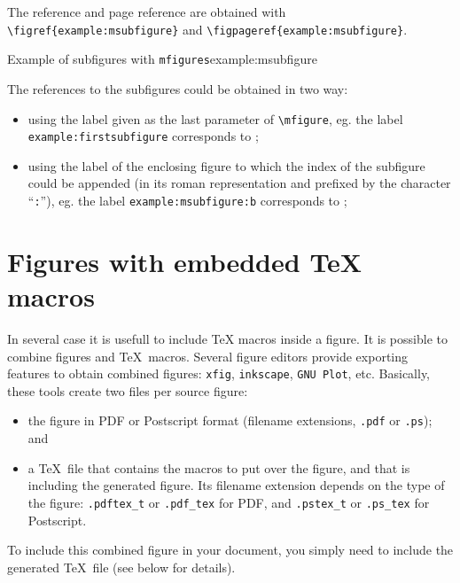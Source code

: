 \documentclass[book]{upmethodology-document}
\begin{document}
The reference and page reference are obtained with \texttt{{\textbackslash}figref\{example:msubfigure\}} and \texttt{{\textbackslash}figpageref\{example:msubfigure\}}.

\begin{mfigures}{Example of subfigures with \texttt{mfigures}}{example:msubfigure}
	\hfill
\end{mfigures}

The references to the subfigures could be obtained in two way:\nopagebreak\begin{itemize}
\item using the label given as the last parameter of \texttt{{\textbackslash}mfigure}, eg. the label \texttt{example:firstsubfigure} corresponds to ;
\item using the label of the enclosing figure to which the index of the subfigure could be appended (in its roman representation and prefixed by the character ``\texttt{:}''), eg. the label \texttt{example:msubfigure:b} corresponds to ;
\end{itemize}

\section{Figures with embedded \TeX\xspace macros}

In several case it is usefull to include \TeX\xspace macros inside a figure. It is possible to combine figures and \TeX\ macros. Several figure editors provide exporting features to obtain combined figures: \texttt{xfig}, \texttt{inkscape}, \texttt{GNU Plot}, etc. Basically, these tools create two files per source figure: \begin{itemize}
\item the figure in PDF or Postscript format (filename extensions, \texttt{.pdf} or \texttt{.ps}); and
\item a \TeX\ file that contains the macros to put over the figure, and that is including the generated figure. Its filename extension depends on the type of the figure: \texttt{.pdftex\_t} or \texttt{.pdf\_tex} for PDF, and \texttt{.pstex\_t} or \texttt{.ps\_tex} for Postscript.
\end{itemize}
To include this combined figure in your document, you simply need to include the generated \TeX\ file (see below for details).
\end{document}

